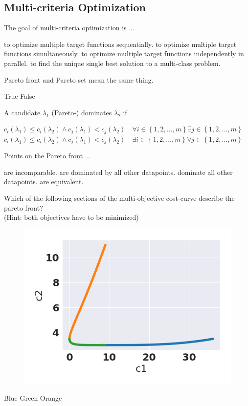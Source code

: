 \documentclass{exam}
\begin{document}
\begin{questions}
\clearpage
\section{Multi-criteria Optimization}
\question The goal of multi-criteria optimization is ...
\begin{choices}
    \choice to optimize multiple target functions sequentially.
    \choice to optimize multiple target functions simultaneously. %
    \choice to optimize multiple target functions independently in parallel.
    \choice to find the unique single best solution to a multi-class problem.
\end{choices}

\question Pareto front and Pareto set mean the same thing.
\begin{choices}
    \choice True
    \choice False %
\end{choices}

\question A candidate $\lambda_1$ (Pareto-) dominates $\lambda_2$ if
\begin{choices}
    \choice $c_i(\lambda_1)\leq c_i(\lambda_2) \land c_j(\lambda_1) < c_j(\lambda_2)\quad\forall i \in \left\{1, 2, \ldots, m\right\} \exists j \in \left\{1, 2, \ldots, m\right\}$
    \choice $c_i(\lambda_1)\leq c_i(\lambda_2) \land c_j(\lambda_1) < c_j(\lambda_2)\quad\exists i \in \left\{1, 2, \ldots, m\right\} \forall j \in \left\{1, 2, \ldots, m\right\}$ %
\end{choices}

\question Points on the Pareto front ...
\begin{choices}
    \choice are incomparable.
    \choice are dominated by all other datapoints.
    \choice dominate all other datapoints. %
    \choice are equivalent. %
\end{choices}

\question Which of the following sections of the multi-objective cost-curve describe the pareto front?\\
(Hint: both objectives have to be minimized)
\begin{choices}
\begin{minipage}{\linewidth} 
\begin{figure}\vspace*{-.6cm}
    \includegraphics[width=.25\textwidth]{pareto_multi_choice.png}
\end{figure}
    \choice Blue
    \choice Green  %
    \choice Orange
\end{minipage}
\end{choices}
\hfill\\


\end{questions}
\end{document}

